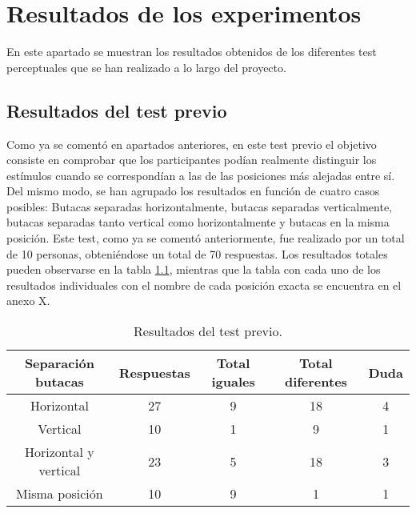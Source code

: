 \documentclass[11pt,a4paper,twoside]{book}
\author{Víctor de Tejada Molera}
\begin{document}
\chapter{Resultados de los experimentos}
    En este apartado se muestran los resultados obtenidos de los diferentes test perceptuales que se han realizado a lo largo del proyecto. 
    \section{Resultados del test previo}
        Como ya se comentó en apartados anteriores, en este test previo el objetivo consiste en comprobar que los participantes podían realmente distinguir los estímulos cuando se correspondían a las de las posiciones más alejadas entre sí. Del mismo modo, se han agrupado los resultados en función de cuatro casos posibles: Butacas separadas horizontalmente, butacas separadas verticalmente, butacas separadas tanto vertical como horizontalmente y butacas en la misma posición. Este test, como ya se comentó anteriormente, fue realizado por un total de 10 personas, obteniéndose un total de 70 respuestas. Los resultados totales pueden observarse en la tabla \ref{tablaTestPrevio}, mientras que la tabla con cada uno de los resultados individuales con el nombre de cada posición exacta se encuentra en el anexo X.
        
        \begin{table}[H]
			\begin{center}
			\begin{scriptsize}
			\begin{tabular}{| c | c | c | c | c |}
			    \hline
				\textbf{Separación butacas}&\textbf{Respuestas}&\textbf{Total iguales}&\textbf{Total diferentes}&\textbf{Duda}\\ \hline
                Horizontal&27&9&18&4\\ \hline
                Vertical&10&1&9&1\\ \hline
                Horizontal y vertical&23&5&18&3\\ \hline
                Misma posición&10&9&1&1\\ \hline
			\end{tabular}
			\caption{Resultados del test previo.}
			\label{tablaTestPrevio}
			\end{scriptsize}
			\end{center}	
		\end{table}	
\end{document}
